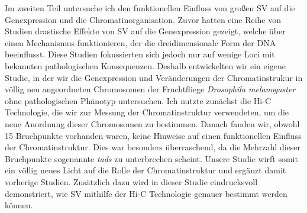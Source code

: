 
Im zweiten Teil untersuche ich den funktionellen Einfluss von großen SV
auf die Genexpression und die Chromatinorganisation.
Zuvor hatten eine Reihe von Studien drastische Effekte von SV auf die
Genexpression gezeigt, welche über einen Mechanismus funktionieren, der die
dreidimensionale Form der DNA be\-ein\-flusst. Diese Studien fokussierten sich
jedoch nur auf wenige Loci mit bekannten pathologischen Konsequenzen. Deshalb
entwickelten wir ein eigene Studie, in der wir die Genexpression und Veränderungen der
Chromatinstrukur in völlig neu angeordneten Chromosomen der Fruchtfliege
\textit{Drosophila melanogaster} ohne pathologischen Phänotyp untersuchen. Ich
nutzte zunächst die Hi-C Technologie, die wir zur Messung der Chromatinstruktur
verwendeten, um die neue Anordnung dieser Chromosomen zu bestimmen. Danach fanden
wir, obwohl 15 Bruchpunkte vorhanden waren, keine Hinweise auf einen funktionellen
Einfluss der Chromatinstruktur. Dies war besonders überraschend, da die Mehrzahl
dieser Bruchpunkte sogenannte \emph{\aclp{tad}} zu unterbrechen scheint. Unsere
Studie wirft somit ein völlig neues Licht auf die Rolle der Chromatinstruktur und
ergänzt damit vorherige Studien. Zusätzlich dazu wird in dieser Studie eindrucksvoll
demonstriert, wie SV mithilfe der Hi-C Technologie genauer bestimmt werden können.


